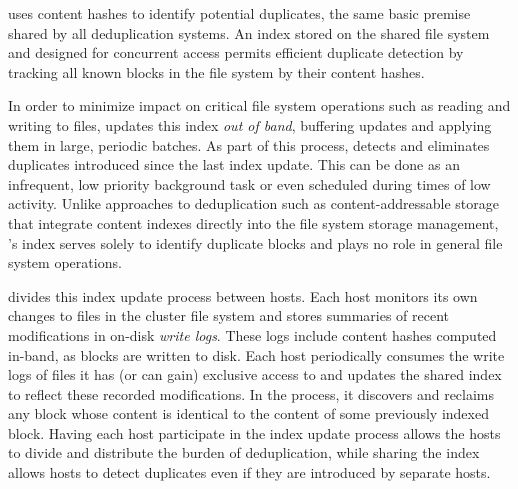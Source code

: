 \DeDe uses content hashes to identify potential duplicates,
the same basic premise shared by all deduplication systems.  An index
stored on the shared file system and designed for concurrent access
permits efficient duplicate detection by tracking all known blocks in
the file system by their content hashes.




In order to minimize impact on critical file system operations such as
reading and writing to files, \DeDe updates this index \emph{out of
  band}, buffering updates and applying them in large, periodic
batches.  As part of this process, \DeDe detects and eliminates
duplicates introduced since the last index update.  This can be
done as an infrequent, low priority
background task or even scheduled during times of low
activity.  Unlike approaches to deduplication such as
content-addressable storage that integrate content indexes directly
into the file system storage management, \DeDe's index serves solely to
identify duplicate blocks and plays no role in general file system
operations.

\DeDe divides this index update process between hosts.  Each host
monitors its own changes to files in the cluster file system and
stores summaries of recent modifications in on-disk \emph{write logs}.
These logs include content hashes computed in-band, as blocks are
written to disk.  Each host periodically consumes the write logs of files
it has (or can gain) exclusive access to and updates the shared index
 to reflect these recorded modifications. In
the process, it discovers and reclaims any block whose content is
identical to the content of some previously indexed block.  Having
each host participate in the index update process allows the hosts to
divide and distribute the burden of deduplication, while sharing the
index allows hosts to detect duplicates even if they are introduced by
separate hosts. 

